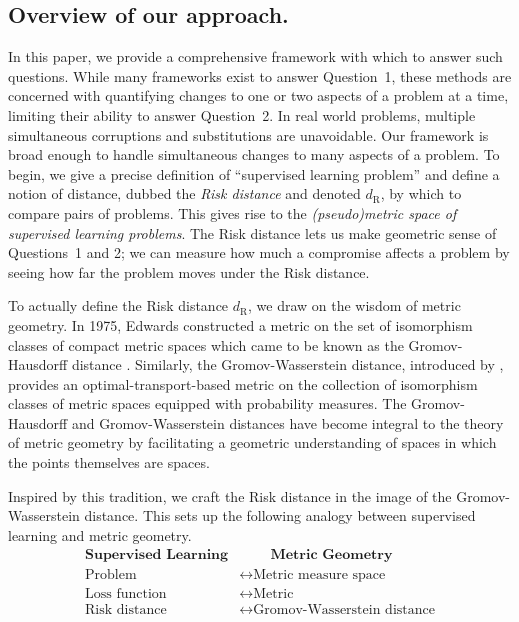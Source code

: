 \documentclass[twoside,11pt]{article}
\newcommand{\dexp}[1][]{d_{\mathrm{R}#1}}
\begin{document}
\subsection{Overview of our approach.}
In this paper, we provide a comprehensive framework with which to answer such questions. While many frameworks exist to answer Question~1, these methods are concerned with quantifying changes to one or two aspects of a problem at a time, limiting their ability to answer Question~2. In real world problems, multiple simultaneous corruptions and substitutions are unavoidable.
Our framework is broad enough to handle simultaneous changes to many aspects of a problem. To begin, we give a precise definition of ``supervised learning problem'' and define a notion of distance, dubbed the \emph{Risk distance} and denoted $\dexp$, by which to compare pairs of problems.
This gives rise to the \emph{(pseudo)metric space of supervised learning problems}. The Risk distance lets us make geometric sense of Questions~1 and 2; we can measure how much a compromise affects a problem by seeing how far the problem moves under the Risk distance.


To actually define the Risk distance $\dexp$, we draw on the wisdom of metric geometry.
In 1975, Edwards constructed a metric on the set of isomorphism classes of compact metric spaces which came to be known as the Gromov-Hausdorff distance \citep{edwards_structure_1975, gromov_structures_1981}.
Similarly, the Gromov-Wasserstein distance, introduced by \citet{memoli_GH_Distance,memoli_gromovwasserstein_2011}, provides an optimal-transport-based metric on the collection of isomorphism classes of metric spaces equipped with probability measures. The Gromov-Hausdorff and Gromov-Wasserstein distances have become integral to the theory of metric geometry by facilitating a geometric understanding of spaces in which the points themselves are spaces.

Inspired by this tradition, we craft the Risk distance in the image of the Gromov-Wasserstein distance. This sets up the following analogy between supervised learning and metric geometry.
\begin{align*}
    \textbf{Supervised Learning} & \qquad\ \textbf{Metric Geometry}\\
    \text{Problem}&\longleftrightarrow\text{Metric measure space} \\
    \text{Loss function}&\longleftrightarrow\text{Metric} \\
    \text{Risk distance}&\longleftrightarrow\text{Gromov-Wasserstein distance}
\end{align*}
\end{document}
